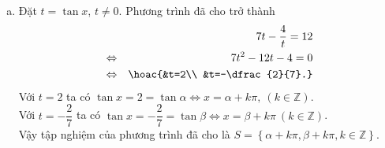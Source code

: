 \begin{bt}
{\begin{enumerate}[a)]
			\item Đặt $t=\tan x$, $t\ne 0$. Phương trình đã cho trở thành
			\begin{eqnarray*}
				&&7t-\dfrac{4}{t}=12\\
				&\Leftrightarrow &7t^2-12t-4=0\\
				&\Leftrightarrow &\hoac{&t=2\\ &t=-\dfrac{2}{7}.}
			\end{eqnarray*}
			Với $t=2$ ta có $\tan x=2=\tan\alpha\Leftrightarrow x=\alpha +k\pi,\ (k\in\mathbb{Z})$.\\
			Với $t=-\dfrac{2}{7}$ ta có $\tan x=-\dfrac{2}{7}=\tan\beta\Leftrightarrow x=\beta+k\pi\ (k\in\mathbb{Z})$.\\
			Vậy tập nghiệm của phương trình đã cho là $S=\left\{\alpha +k\pi,\beta+k\pi, k\in\mathbb{Z} \right\}$.
		\end{enumerate}
	}
\end{bt}

